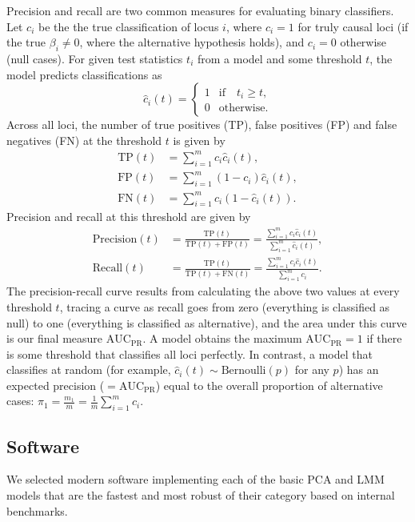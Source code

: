 \documentclass[11pt]{article}
\newcommand{\auc}{\text{AUC}_\text{PR}}
\begin{document}
Precision and recall are two common measures for evaluating binary classifiers.
Let $c_i$ be the the true classification of locus $i$, where $c_i = 1$ for truly causal loci (if the true $\beta_i \ne 0$, where the alternative hypothesis holds), and $c_i = 0$ otherwise (null cases).
For given test statistics $t_i$ from a model and some threshold $t$, the model predicts classifications as
$$
\hat{c}_i(t) =
\begin{cases}
  1 & \text{if} \quad t_i \ge t, \\
  0 & \text{otherwise}.
\end{cases}
$$
Across all loci, the number of true positives (TP), false positives (FP) and false negatives (FN) at the threshold $t$ is given by
\begin{align*}
  \text{TP}(t)
  &=
    \sum_{i = 1}^m c_i \hat{c}_i(t)
    , \\
  \text{FP}(t)
  &=
    \sum_{i = 1}^m (1 - c_i) \hat{c}_i(t)
    , \\
  \text{FN}(t)
  &=
    \sum_{i = 1}^m c_i \left( 1 - \hat{c}_i(t) \right)
    .
\end{align*}
Precision and recall at this threshold are given by
\begin{align*}
  \text{Precision}(t)
  &=
    \frac{ \text{TP}(t) }{ \text{TP}(t) + \text{FP}(t) }
    =
    \frac{ \sum_{i = 1}^m c_i \hat{c}_i(t) }{ \sum_{i = 1}^m \hat{c}_i(t) }
    , \\
  \text{Recall}(t)
  &=
    \frac{ \text{TP}(t) }{ \text{TP}(t) + \text{FN}(t) }
    =
    \frac{ \sum_{i = 1}^m c_i \hat{c}_i(t) }{ \sum_{i = 1}^m c_i }
    .
\end{align*}
The precision-recall curve results from calculating the above two values at every threshold $t$, tracing a curve as recall goes from zero (everything is classified as null) to one (everything is classified as alternative), and the area under this curve is our final measure $\auc$.
A model obtains the maximum $\auc = 1$ if there is some threshold that classifies all loci perfectly.
In contrast, a model that classifies at random (for example, $\hat{c}_i(t) \sim \text{Bernoulli}(p)$ for any $p$) has an expected precision ($= \auc$) equal to the overall proportion of alternative cases:
$\pi_1 = \frac{m_1}{m} = \frac{1}{m} \sum_{i = 1}^m c_i$.

\subsection{Software}

We selected modern software implementing each of the basic PCA and LMM models that are the fastest and most robust of their category based on internal benchmarks.
\end{document}
